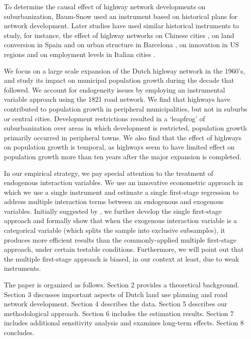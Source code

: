 \documentclass[a4paper,authoryear,review]{elsarticle}  	%
\begin{document}
	To determine the causal effect of highway network developments on suburbanization, Baum-Snow used an instrument based on historical plans for network development. Later studies have used similar historical instruments to study, for instance, the effect of highway networks on Chinese cities \citep{Baum-Snow2012}, on land conversion in Spain and on urban structure in Barcelona \citep{Garcia-Lopez2014,Garcia-Lopez2015}, on innovation in US regions \citep{Agrawal2016} and on employment levels in Italian cities \citep{Percoco2016}. %
	
	We focus on a large scale expansion of the Dutch highway network in the 1960’s, and study its impact on municipal population growth during the decade that followed. We account for endogeneity issues by employing an instrumental variable approach using the 1821 road network. 	
	We find that highways have contributed to population growth in peripheral municipalities, but not in suburbs or central cities. Development restrictions resulted in a ‘leapfrog’ of suburbanization over areas in which development is restricted, population growth primarily occurred in peripheral towns. We also find that the effect of highways on population growth is temporal, as highways seem to have limited effect on population growth more than ten years after the major expansion is completed.
	
	In our empirical strategy, we pay special attention to the treatment of endogenous interaction variables. We use an innovative econometric approach in which we use a single instrument and estimate a single first-stage regression to address multiple interaction terms between an endogenous and exogenous variables. Initially suggested by \citet{Balli2013}, we further develop the single first-stage approach and formally show that when the exogenous interaction variable is a categorical variable (which splits the sample into exclusive subsamples), it produces more efficient results than the commonly-applied multiple first-stage approach, under certain testable conditions.	
	Furthermore, we will point out that the multiple first-stage approach is biased, in our context at least, due to weak instruments. 
	
	The paper is organized as follows. Section 2 provides a theoretical background. Section 3 discusses important aspects of Dutch land use planning and road network development. Section 4 describes the data. Section 5 describes our methodological approach. Section 6 includes the estimation results. Section 7 includes additional sensitivity analysis and examines long-term effects. Section 8 concludes.
	
\end{document}
